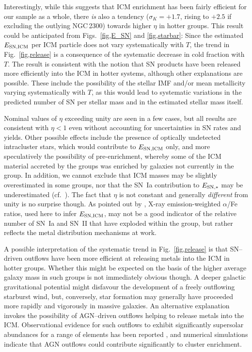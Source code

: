 \documentclass[useAMS,usenatbib]{mn2e}
\begin{document}
Interestingly, while this suggests that ICM enrichment has been fairly
efficient for our sample as a whole, there {\em is} also a tendency
($\sigma_K=+1.7$, rising to $+2.5$ if excluding the outlying
NGC\,2300) towards higher $\eta$ in hotter groups. This result could
be anticipated from Figs.~\ref{fig,E_SN} and \ref{fig,starbar}: Since
the estimated $E_{\rm SN,ICM}$ per ICM particle does not vary
systematically with $T$, the trend in Fig.~\ref{fig,release} is a
consequence of the systematic decrease in cold fraction with $T$. The
result is consistent with the notion that SN products have been
released more efficiently into the ICM in hotter systems, although
other explanations are possible. These include the possibility of the
stellar IMF and/or mean metallicity varying systematically with $T$,
as this would lead to systematic variations in the predicted number of
SN per stellar mass and in the estimated stellar mass itself.

Nominal values of $\eta$ exceeding unity are seen in a few cases, but
all results are consistent with $\eta < 1$ even without accounting for
uncertainties in SN rates and yields. Other possible effects include
the presence of optically undetected intracluster stars, which would
contribute to $E_{\rm SN,ICM}$ only, and more speculatively the
possibility of pre-enrichment, whereby some of the ICM material
accreted by the groups was enriched by galaxies not currently in the
group. In addition, we cannot exclude that ICM masses may be slightly
overestimated in some groups, nor that the SN~Ia contribution to
$E_{\rm SN, \ast}$ may be underestimated (cf.\ \citealt{siva09}). The
fact that $\eta$ is not constant and generally {\em different} from
unity is no surprise though. As pointed out by \citet{dave08}, X-ray
emission-weighted $\alpha$/Fe ratios, used here to infer $E_{\rm
SN,ICM}$, may not be a good indicator of the relative number of SN~Ia
and SN~II that have exploded within the group, but rather reflects the
metal distribution mechanisms at work.

A possible interpretation of the systematic trend in
Fig.~\ref{fig,release} is that SN--driven outflows have been more
efficient at releasing metals into the ICM in hotter groups. Whether
this might be expected on the basis of the higher average galaxy mass
in such groups is not immediately obvious though. A deeper galactic
gravitational potential might disfavour the development of a freely
outflowing starburst wind, but, conversely, star formation may
generally have proceeded more rapidly and vigorously in massive
galaxies. An alternative explanation invokes the possibility of
AGN--driven outflows helping to release metals into the ICM.
Observational evidence for such outflows to exhibit significantly
supersolar abundances for a range of elements has been reported
\citep{arav07,wang07}, and numerical simulations \citep{moll07}
indicate that AGN outflows could contribute significantly to cluster
enrichment.
\end{document}
